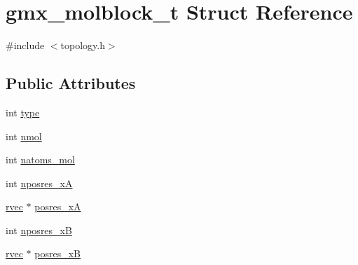 \hypertarget{structgmx__molblock__t}{\section{gmx\-\_\-molblock\-\_\-t \-Struct \-Reference}
\label{structgmx__molblock__t}
}


{\ttfamily \#include $<$topology.\-h$>$}

\subsection*{\-Public \-Attributes}
\begin{DoxyCompactItemize}
\item 
int \hyperlink{structgmx__molblock__t_ad0067f80b655c5a8086970db972f169c}{type}
\item 
int \hyperlink{structgmx__molblock__t_ad66167c805c7e81d2b03230107f6988e}{nmol}
\item 
int \hyperlink{structgmx__molblock__t_a993f1da9863c59dea4e691a24a5fb31b}{natoms\-\_\-mol}
\item 
int \hyperlink{structgmx__molblock__t_a529db647b5635cb511db3a207b5defed}{nposres\-\_\-x\-A}
\item 
\hyperlink{share_2template_2gromacs_2types_2simple_8h_aa02a552a4abd2f180c282a083dc3a999}{rvec} $\ast$ \hyperlink{structgmx__molblock__t_ab7881c1743297bca61466309cb193f0b}{posres\-\_\-x\-A}
\item 
int \hyperlink{structgmx__molblock__t_a6587b7417c299632e8ed0e6a68bcbe7d}{nposres\-\_\-x\-B}
\item 
\hyperlink{share_2template_2gromacs_2types_2simple_8h_aa02a552a4abd2f180c282a083dc3a999}{rvec} $\ast$ \hyperlink{structgmx__molblock__t_a5aa9e1c390e5f72c288bbe62d8352d9d}{posres\-\_\-x\-B}
\end{DoxyCompactItemize}


